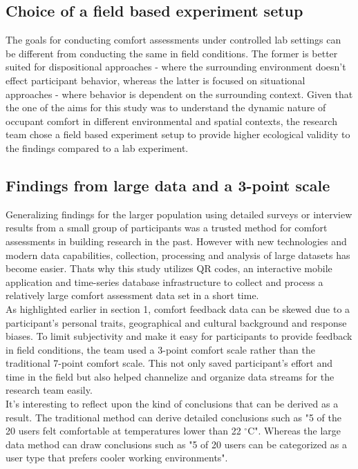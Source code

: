 
\subsection{Choice of a field based experiment setup}

The goals for conducting comfort assessments under controlled lab settings can be different from conducting the same in field conditions. The former is better suited for dispositional approaches - where the surrounding environment doesn't effect participant behavior, whereas the latter is focused on situational approaches - where behavior is dependent on the surrounding context.
Given that the one of the aims for this study was to understand the dynamic nature of occupant comfort in different environmental and spatial contexts, the research team chose a field based experiment setup to provide higher ecological validity \cite{andrade2018internal}to the findings compared to a lab experiment.           


\subsection{Findings from large data and a 3-point scale}

Generalizing findings for the larger population using detailed surveys or interview results from a small group of participants was a trusted method for comfort assessments in building research in the past. However with new technologies and modern data capabilities, collection, processing and analysis of large datasets has become easier. Thats why this study utilizes QR codes, an interactive mobile application and time-series database infrastructure to collect and process a relatively large comfort assessment data set in a short time.\\

As highlighted earlier in section 1, comfort feedback data can be skewed due to a participant's personal traits, geographical and cultural background and response biases. To limit subjectivity and make it easy for participants to provide feedback in field conditions, the team used a 3-point comfort scale rather than the traditional 7-point comfort scale. This not only saved participant's effort and time in the field but also helped channelize and organize data streams for the research team easily.\\

It's interesting to reflect upon the kind of conclusions that can be derived as a result. The traditional method can derive detailed conclusions such as "5 of the 20 users felt comfortable at temperatures lower than 22 $^\circ$C". Whereas the large data method can draw conclusions such as "5 of 20 users can be categorized as a user type that prefers cooler working environments". 



